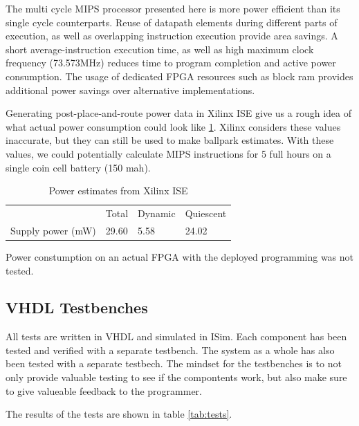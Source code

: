 The multi cycle MIPS processor presented here is more power efficient than its single cycle counterparts.
Reuse of datapath elements during different parts of execution, as well as overlapping instruction execution provide area savings.
A short average-instruction execution time, as well as high maximum clock frequency (73.573MHz) reduces time to program completion and active power consumption.
The usage of dedicated FPGA resources such as block ram provides additional power savings over alternative implementations.

Generating post-place-and-route power data in Xilinx ISE give us a rough idea of what actual power consumption could look like \ref{tab:power-estimates}.
Xilinx considers these values inaccurate, but they can still be used to make ballpark estimates.
With these values, we could potentially calculate MIPS instructions for 5 full hours on a single coin cell battery (150 mah).

\begin{table}[h]
  \centering
  \begin{tabular}{llll}
    & Total & Dynamic & Quiescent \\
    Supply power (mW) & 29.60 & 5.58    & 24.02
  \end{tabular}
  \caption{Power estimates from Xilinx ISE}
  \label{tab:power-estimates}
\end{table}

Power constumption on an actual FPGA with the deployed programming was not tested.

\subsection{VHDL Testbenches}

All tests are written in VHDL and simulated in ISim.
Each component has been tested and verified with a separate testbench.
The system as a whole has also been tested with a separate testbech.
The mindset for the testbenches is to not only provide valuable testing to see if the compontents work,
but also make sure to give valueable feedback to the programmer.

The results of the tests are shown in table \ref{tab:tests}.

